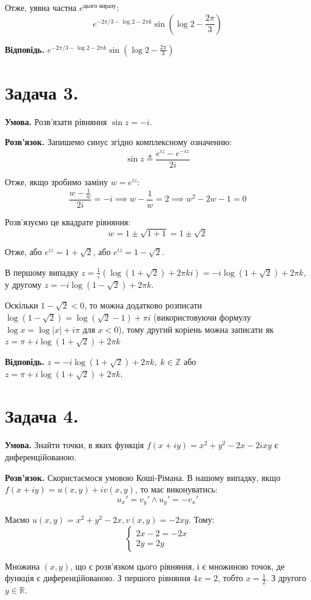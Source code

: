 \documentclass[14pt]{extarticle}
\begin{document}
Отже, уявна частна $e^{\text{цього виразу}}$:
\[
e^{-2\pi/3 - \log 2 - 2\pi k} \sin\left(\log 2 - \frac{2\pi}{3}\right)
\]

\textbf{Відповідь.} $e^{-2\pi/3 - \log 2 - 2\pi k} \sin\left(\log 2 - \frac{2\pi}{3}\right)$

\pagebreak
\section*{Задача 3.} 

\textbf{Умова.} Розв'язати рівняння $\sin z = -i$.

\textbf{Розв'язок.} Запишемо синус згідно комплексному означенню:
\[
\sin z \triangleq \frac{e^{iz}-e^{-iz}}{2i}
\]

Отже, якщо зробимо заміну $w=e^{iz}$:
\[
\frac{w-\frac{1}{w}}{2i} = -i \implies w-\frac{1}{w} = 2 \implies w^2 - 2w - 1 = 0 
\]

Розв'язуємо це квадрате рівняння:
\[
w = 1 \pm \sqrt{1 + 1} = 1 \pm \sqrt{2}
\]

Отже, або $e^{iz}=1+\sqrt{2}$, або $e^{iz}=1-\sqrt{2}$. 

В першому випадку $z = \frac{1}{i}(\log(1+\sqrt{2})+2\pi k i) = -i\log(1+\sqrt{2})+2\pi k$, у другому $z=-i\log(1-\sqrt{2})+2\pi k$.

Оскільки $1-\sqrt{2}<0$, то можна додатково розписати $\log(1-\sqrt{2})=\log(\sqrt{2}-1)+\pi i$ (використовуючи формулу $\log x = \log |x| + i \pi$ для $x<0$), тому другий коріень можна записати як $z=\pi+i \log(1+\sqrt{2}) + 2\pi k$

\textbf{Відповідь.} $z=-i\log(1 + \sqrt{2})+2\pi k, \; k \in \mathbb{Z}$ або $z=\pi +i \log(1+\sqrt{2})+2\pi k$.
\pagebreak
\section*{Задача 4.} 

\textbf{Умова.} Знайти точки, в яких функція $f(x+iy)=x^2+y^2-2x - 2ixy$ є диференційованою.

\textbf{Розв'язок.} Скористаємося умовою Коші-Рімана. В нашому випадку, якщо $f(x+iy)=u(x,y)+iv(x,y)$, то має виконуватись:
\[
u_x' = v_y' \wedge u_y' = -v_x'
\]

Маємо $u(x,y)=x^2+y^2-2x, v(x,y)=-2xy$. Тому:
\[
\begin{cases}
    2x-2 = -2x \\
    2y = 2y
\end{cases}
\]

Множина $(x,y)$, що є розв'язком цього рівняння, і є множиною точок, де функція є диференційованою. З першого рівняння $4x=2$, тобто $x=\frac{1}{2}$. З другого $y \in \mathbb{R}$. 
\end{document}

